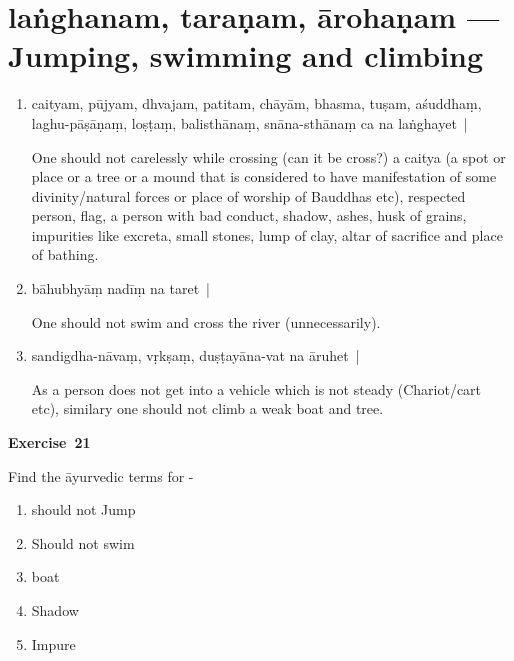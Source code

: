 \chapter{laṅghanam, taraṇam, ārohaṇam --- Jumping, swimming and climbing}
\vspace{-10pt}
\begin{enumerate}
\itemsep=0pt
\item {}

caityam, pūjyam, dhvajam, patitam, chāyām, bhasma, tuṣam, aśuddhaṃ, laghu-pāṣāṇaṃ, loṣṭaṃ, balisthānaṃ, snāna-sthānaṃ ca  na laṅghayet~| 

One should not carelessly while crossing (can it be cross?) a caitya (a spot or place or a tree or a mound that is considered to have manifestation of some divinity/natural forces or place of worship of Bauddhas etc), respected person, flag, a person with bad conduct, shadow, ashes, husk of grains, impurities like excreta, small stones, lump of clay, altar of sacrifice and place of bathing. 

\item {}

bāhubhyāṃ nadīṃ na taret~| 

One should not swim and cross the river (unnecessarily). 

\item {}

sandigdha-nāvaṃ, vṛkṣaṃ, duṣṭayāna-vat na āruhet~|    

As a person does not get into a vehicle which is not steady (Chariot/cart etc), similary one should not climb a weak boat and tree.
\end{enumerate}
\vspace{-10pt}

\centerline{\textbf{Exercise~21}}

Find the āyurvedic terms for -
\vspace{-10pt}
\begin{enumerate}
\itemsep=0pt
\renewcommand{\theenumi}{\alph{enumi}}
\renewcommand{\labelenumi}{\theenumi.}
\item should not Jump
\item Should not swim 
\item boat 
\item Shadow 
\item Impure
\end{enumerate}


